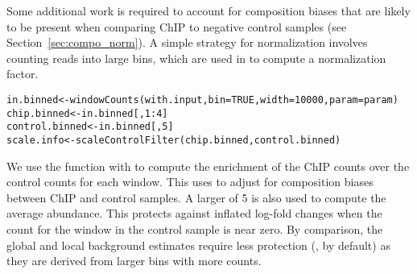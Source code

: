 \documentclass{report}\usepackage[]{graphicx}\usepackage[usenames,dvipsnames]{color}
\newcommand{\hlnum}[1]{\textcolor[rgb]{0.816,0.125,0.439}{#1}}%
\newcommand{\hlcom}[1]{\textcolor[rgb]{0.502,0.502,0.502}{\textit{#1}}}%
\newcommand{\hlopt}[1]{\textcolor[rgb]{0,0,0}{#1}}%
\newcommand{\hlstd}[1]{\textcolor[rgb]{0.251,0.251,0.251}{#1}}%
\newcommand{\hlkwb}[1]{\textcolor[rgb]{0,0,0}{#1}}%
\newcommand{\hlkwc}[1]{\textcolor[rgb]{0.251,0.251,0.251}{#1}}%
\newcommand{\hlkwd}[1]{\textcolor[rgb]{0.878,0.439,0.125}{#1}}%
\newenvironment{knitrout}{}{} %
\begin{document}
\begin{knitrout}
\color{fgcolor}
\end{knitrout}

Some additional work is required to account for composition biases that are likely to be present when comparing ChIP to negative control samples (see Section~\ref{sec:compo_norm}).
A simple strategy for normalization involves counting reads into large bins, which are used in  to compute a normalization factor.

\begin{knitrout}
\color{fgcolor}\begin{kframe}
\begin{alltt}
\hlstd{in.binned} \hlkwb{<-} \hlkwd{windowCounts}\hlstd{(with.input,} \hlkwc{bin}\hlstd{=}\hlnum{TRUE}\hlstd{,} \hlkwc{width}\hlstd{=}\hlnum{10000}\hlstd{,} \hlkwc{param}\hlstd{=param)}
\hlstd{chip.binned} \hlkwb{<-} \hlstd{in.binned[,}\hlnum{1}\hlopt{:}\hlnum{4}\hlstd{]}
\hlstd{control.binned} \hlkwb{<-} \hlstd{in.binned[,}\hlnum{5}\hlstd{]}
\hlstd{scale.info} \hlkwb{<-} \hlkwd{scaleControlFilter}\hlstd{(chip.binned, control.binned)}
\end{alltt}
\end{kframe}
\end{knitrout}

We use the  function with  to compute the enrichment of the ChIP counts over the control counts for each window.
This uses  to adjust for composition biases between ChIP and control samples.
A larger  of 5 is also used to compute the average abundance.
This protects against inflated log-fold changes when the count for the window in the control sample is near zero.
By comparison, the global and local background estimates require less protection (, by default) as they are derived from larger bins with more counts.
\end{document}
